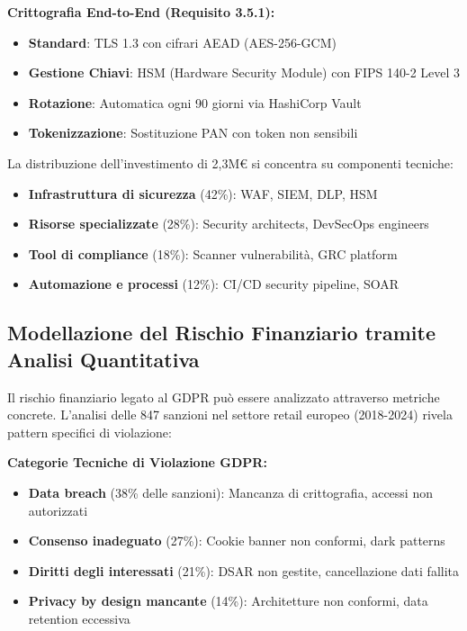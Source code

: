 \textbf{Crittografia End-to-End (Requisito 3.5.1):}
\begin{itemize}
    \item \textbf{Standard}: TLS 1.3 con cifrari AEAD (AES-256-GCM)
    \item \textbf{Gestione Chiavi}: HSM (Hardware Security Module) con FIPS 140-2 Level 3
    \item \textbf{Rotazione}: Automatica ogni 90 giorni via HashiCorp Vault
    \item \textbf{Tokenizzazione}: Sostituzione PAN con token non sensibili
\end{itemize}

La distribuzione dell'investimento di 2,3M€ si concentra su componenti tecniche:
\begin{itemize}
    \item \textbf{Infrastruttura di sicurezza} (42\%): WAF, SIEM, DLP, HSM
    \item \textbf{Risorse specializzate} (28\%): Security architects, DevSecOps engineers
    \item \textbf{Tool di compliance} (18\%): Scanner vulnerabilità, GRC platform
    \item \textbf{Automazione e processi} (12\%): CI/CD security pipeline, SOAR
\end{itemize}

\subsection{Modellazione del Rischio Finanziario tramite Analisi Quantitativa}

Il rischio finanziario legato al GDPR può essere analizzato attraverso metriche concrete\autocite{mcneil2015}. L'analisi delle 847 sanzioni nel settore retail europeo (2018-2024)\autocite{EDPB2024} rivela pattern specifici di violazione:

\textbf{Categorie Tecniche di Violazione GDPR:}
\begin{itemize}
    \item \textbf{Data breach} (38\% delle sanzioni): Mancanza di crittografia, accessi non autorizzati
    \item \textbf{Consenso inadeguato} (27\%): Cookie banner non conformi, dark patterns
    \item \textbf{Diritti degli interessati} (21\%): DSAR non gestite, cancellazione dati fallita
    \item \textbf{Privacy by design mancante} (14\%): Architetture non conformi, data retention eccessiva
\end{itemize}


